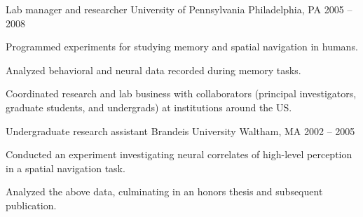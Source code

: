 \begin{cventries}
  \cventry
    {Lab manager and researcher} %
    {University of Pennsylvania} %
    {Philadelphia, PA} %
    {2005 -- 2008} %
    {
      \begin{cvitems} %
        \item {Programmed experiments for studying memory and spatial navigation in humans.}
        \item {Analyzed behavioral and neural data recorded during memory tasks.}
        \item {Coordinated research and lab business with collaborators (principal investigators, graduate students, and undergrads) at institutions around the US.}
      \end{cvitems}
    }

  \cventry
    {Undergraduate research assistant} %
    {Brandeis University} %
    {Waltham, MA} %
    {2002 -- 2005} %
    {
      \begin{cvitems} %
        \item {Conducted an experiment investigating neural correlates of high-level perception in a spatial navigation task.}
        \item {Analyzed the above data, culminating in an honors thesis and subsequent publication.}
      \end{cvitems}
    }

\end{cventries}

